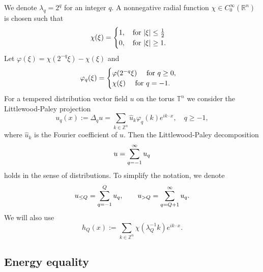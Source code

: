 \documentclass{amsart}
\newcommand{\bg}{\begin{equation}}
\newcommand{\ed}{\end{equation}}
\numberwithin{Theorem}{section}
\theoremstyle{definition}
\theoremstyle{remark}
\newcommand{\R}{\mathbf{R}}
\def  \R   {{\mathbb R}}
\def  \Z   {{\mathbb Z}}
\def  \T   {{\mathbb T}}
\begin{document}
We denote $\lambda_q=2^q$ for an integer $q$. A nonnegative radial function $\chi\in C_0^\infty(\R^n)$ is chosen such that 
\begin{equation}\notag
\chi(\xi)=
\begin{cases}
1, \ \ \mbox { for } |\xi|\leq\frac{1}{2}\\
0, \ \ \mbox { for } |\xi|\geq 1.
\end{cases}
\end{equation}
Let $\varphi(\xi)=\chi(2^{-q}\xi)-\chi(\xi)$
and
\begin{equation}\notag
\varphi_q(\xi)=
\begin{cases}
\varphi(2^{-q}\xi)  \ \ \ \mbox { for } q\geq 0,\\
\chi(\xi) \ \ \ \mbox { for } q=-1.
\end{cases}
\end{equation}
For a tempered distribution vector field $u$ on the torus $\T^n$ we consider the Littlewood-Paley projection
\begin{equation}
u_q (x):=\Delta_qu = \sum_{k \in \Z^n} \hat{u}_k \varphi_q(k) e^{i k\cdot x}, \quad q \geq -1,
\end{equation}
where $\hat{u}_k$ is the Fourier coefficient of $u$. Then the Littlewood-Paley decomposition
\bg\notag
u=\sum_{q=-1}^\infty u_q
\ed
holds in the sense of distributions. To simplify the notation, we denote
\bg\notag
u_{\leq Q}=\sum_{q=-1}^Qu_q, \qquad u_{> Q}=\sum_{q=Q+1}^\infty u_q.
\ed
We will also use
\[
h_Q(x) := \sum_{k \in \Z^n} \chi(\lambda_Q^{-1}k) e^{i k\cdot x}.
\]




\subsection{Energy equality}
\end{document}
